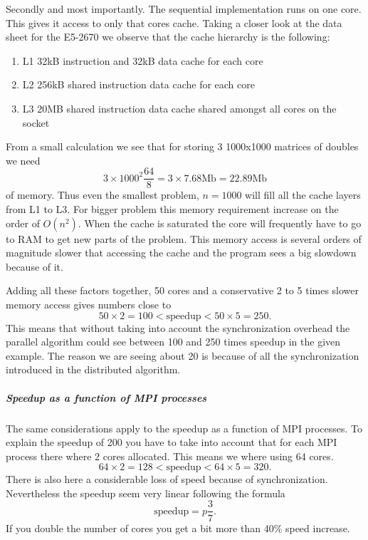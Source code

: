 \documentclass{article}
\begin{document}
Secondly and most importantly. The sequential implementation runs on one core. This
gives it access to only that cores cache. Taking a closer look at the data sheet
for the E5-2670\cite{intel-datasheet} we observe that the cache hierarchy is
the following:
\begin{enumerate}
		\item L1 32kB instruction and 32kB data cache for each core
		\item L2 256kB shared instruction data cache for each core
		\item L3 20MB shared instruction data cache shared amongst all cores on the socket
\end{enumerate}
From a small calculation we see that for storing 3 1000x1000 matrices of doubles we need
\[
3 \times 1000^2 \frac{64}{8} = 3 \times 7.68 \text{Mb} = 22.89 \text{Mb}
\]
of memory.
Thus even the smallest problem, $n=1000$ will fill all the cache layers from L1 to L3.
For bigger problem this memory requirement increase on the order of $O(n^2)$.
When the cache is saturated the core will frequently have to go to RAM to get new parts of the problem. This memory
access is several orders of magnitude slower that accessing the cache and the program sees a big
slowdown because of it.

Adding all these factors together, 50 cores and a conservative 2 to 5 times slower memory access
gives numbers close to
\[
50 \times 2 = 100 < \text{speedup} < 50 \times 5 = 250.
\]
This means that without taking into account the synchronization overhead
the parallel algorithm could see between 100 and 250 times speedup in the given example.
The reason we are seeing about 20 is because
of all the synchronization introduced in the distributed algorithm.

\subparagraph{Speedup as a function of MPI processes}
The same considerations apply to the speedup as a function of MPI processes.
To explain the speedup of 200 you have to take into account that for each MPI
process there where 2 cores allocated. This means we where using 64 cores.
\[
64 \times 2 = 128 < \text{speedup} < 64 \times 5 = 320.
\]
There is also here a considerable loss of speed because of synchronization.
Nevertheless the speedup seem very linear following the formula
\[
\text{speedup} = p\frac{3}{7}.
\]
If you double the number of cores you get a bit more than 40\%
speed increase.
\end{document}
